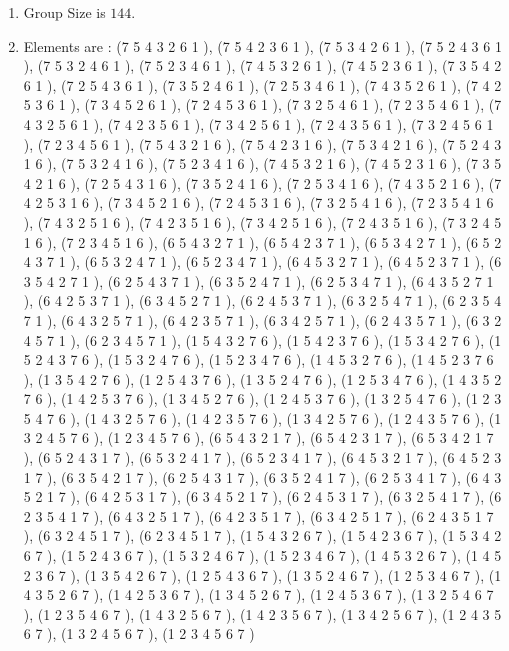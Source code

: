 \documentclass[12pt]{article}
\begin{document}
\begin{enumerate}
\item Group Size is $144$.
\item Elements are : (7 5 4 3 2 6 1  ), (7 5 4 2 3 6 1  ), (7 5 3 4 2 6 1  ), (7 5 2 4 3 6 1  ), (7 5 3 2 4 6 1  ), (7 5 2 3 4 6 1  ), (7 4 5 3 2 6 1  ), (7 4 5 2 3 6 1  ), (7 3 5 4 2 6 1  ), (7 2 5 4 3 6 1  ), (7 3 5 2 4 6 1  ), (7 2 5 3 4 6 1  ), (7 4 3 5 2 6 1  ), (7 4 2 5 3 6 1  ), (7 3 4 5 2 6 1  ), (7 2 4 5 3 6 1  ), (7 3 2 5 4 6 1  ), (7 2 3 5 4 6 1  ), (7 4 3 2 5 6 1  ), (7 4 2 3 5 6 1  ), (7 3 4 2 5 6 1  ), (7 2 4 3 5 6 1  ), (7 3 2 4 5 6 1  ), (7 2 3 4 5 6 1  ), (7 5 4 3 2 1 6  ), (7 5 4 2 3 1 6  ), (7 5 3 4 2 1 6  ), (7 5 2 4 3 1 6  ), (7 5 3 2 4 1 6  ), (7 5 2 3 4 1 6  ), (7 4 5 3 2 1 6  ), (7 4 5 2 3 1 6  ), (7 3 5 4 2 1 6  ), (7 2 5 4 3 1 6  ), (7 3 5 2 4 1 6  ), (7 2 5 3 4 1 6  ), (7 4 3 5 2 1 6  ), (7 4 2 5 3 1 6  ), (7 3 4 5 2 1 6  ), (7 2 4 5 3 1 6  ), (7 3 2 5 4 1 6  ), (7 2 3 5 4 1 6  ), (7 4 3 2 5 1 6  ), (7 4 2 3 5 1 6  ), (7 3 4 2 5 1 6  ), (7 2 4 3 5 1 6  ), (7 3 2 4 5 1 6  ), (7 2 3 4 5 1 6  ), (6 5 4 3 2 7 1  ), (6 5 4 2 3 7 1  ), (6 5 3 4 2 7 1  ), (6 5 2 4 3 7 1  ), (6 5 3 2 4 7 1  ), (6 5 2 3 4 7 1  ), (6 4 5 3 2 7 1  ), (6 4 5 2 3 7 1  ), (6 3 5 4 2 7 1  ), (6 2 5 4 3 7 1  ), (6 3 5 2 4 7 1  ), (6 2 5 3 4 7 1  ), (6 4 3 5 2 7 1  ), (6 4 2 5 3 7 1  ), (6 3 4 5 2 7 1  ), (6 2 4 5 3 7 1  ), (6 3 2 5 4 7 1  ), (6 2 3 5 4 7 1  ), (6 4 3 2 5 7 1  ), (6 4 2 3 5 7 1  ), (6 3 4 2 5 7 1  ), (6 2 4 3 5 7 1  ), (6 3 2 4 5 7 1  ), (6 2 3 4 5 7 1  ), (1 5 4 3 2 7 6  ), (1 5 4 2 3 7 6  ), (1 5 3 4 2 7 6  ), (1 5 2 4 3 7 6  ), (1 5 3 2 4 7 6  ), (1 5 2 3 4 7 6  ), (1 4 5 3 2 7 6  ), (1 4 5 2 3 7 6  ), (1 3 5 4 2 7 6  ), (1 2 5 4 3 7 6  ), (1 3 5 2 4 7 6  ), (1 2 5 3 4 7 6  ), (1 4 3 5 2 7 6  ), (1 4 2 5 3 7 6  ), (1 3 4 5 2 7 6  ), (1 2 4 5 3 7 6  ), (1 3 2 5 4 7 6  ), (1 2 3 5 4 7 6  ), (1 4 3 2 5 7 6  ), (1 4 2 3 5 7 6  ), (1 3 4 2 5 7 6  ), (1 2 4 3 5 7 6  ), (1 3 2 4 5 7 6  ), (1 2 3 4 5 7 6  ), (6 5 4 3 2 1 7  ), (6 5 4 2 3 1 7  ), (6 5 3 4 2 1 7  ), (6 5 2 4 3 1 7  ), (6 5 3 2 4 1 7  ), (6 5 2 3 4 1 7  ), (6 4 5 3 2 1 7  ), (6 4 5 2 3 1 7  ), (6 3 5 4 2 1 7  ), (6 2 5 4 3 1 7  ), (6 3 5 2 4 1 7  ), (6 2 5 3 4 1 7  ), (6 4 3 5 2 1 7  ), (6 4 2 5 3 1 7  ), (6 3 4 5 2 1 7  ), (6 2 4 5 3 1 7  ), (6 3 2 5 4 1 7  ), (6 2 3 5 4 1 7  ), (6 4 3 2 5 1 7  ), (6 4 2 3 5 1 7  ), (6 3 4 2 5 1 7  ), (6 2 4 3 5 1 7  ), (6 3 2 4 5 1 7  ), (6 2 3 4 5 1 7  ), (1 5 4 3 2 6 7  ), (1 5 4 2 3 6 7  ), (1 5 3 4 2 6 7  ), (1 5 2 4 3 6 7  ), (1 5 3 2 4 6 7  ), (1 5 2 3 4 6 7  ), (1 4 5 3 2 6 7  ), (1 4 5 2 3 6 7  ), (1 3 5 4 2 6 7  ), (1 2 5 4 3 6 7  ), (1 3 5 2 4 6 7  ), (1 2 5 3 4 6 7  ), (1 4 3 5 2 6 7  ), (1 4 2 5 3 6 7  ), (1 3 4 5 2 6 7  ), (1 2 4 5 3 6 7  ), (1 3 2 5 4 6 7  ), (1 2 3 5 4 6 7  ), (1 4 3 2 5 6 7  ), (1 4 2 3 5 6 7  ), (1 3 4 2 5 6 7  ), (1 2 4 3 5 6 7  ), (1 3 2 4 5 6 7  ), (1 2 3 4 5 6 7  )
\end{enumerate}
\end{document}
